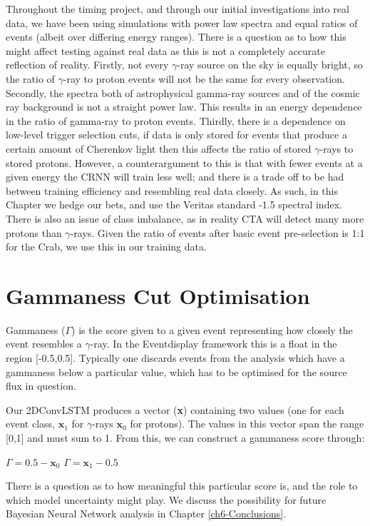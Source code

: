 Throughout the timing project, and through our initial investigations into real data, we have been using simulations with power law spectra and equal ratios of events (albeit over differing energy ranges). There is a question as to how this might affect testing against real data as this is not a completely accurate reflection of reality. Firstly, not every $\gamma$-ray source on the sky is equally bright, so the ratio of $\gamma$-ray to proton events will not be the same for every observation. Secondly, the spectra both of astrophysical gamma-ray sources and of the cosmic ray background is not a straight power law. This results in an energy dependence in the ratio of gamma-ray to proton events. Thirdly, there is a dependence on low-level trigger selection cuts, if data is only stored for events that produce a certain amount of Cherenkov light then this affects the ratio of stored $\gamma$-rays to stored protons. However, a counterargument to this is that with fewer events at a given energy the CRNN will train less well; and there is a trade off to be had between training efficiency and resembling real data closely. As such, in this Chapter we hedge our bets, and use the Veritas standard -1.5 spectral index. There is also an issue of class imbalance, as in reality CTA will detect many more protons than $\gamma$-rays. Given the ratio of events after basic event pre-selection is 1:1 for the Crab, we use this in our training data.

\section{Gammaness Cut Optimisation}
Gammaness ($\Gamma$) is the score given to a given event representing how closely the event resembles a $\gamma$-ray. In the Eventdisplay framework this is a float in the region [-0.5,0.5]. Typically one discards events from the analysis which have a gammaness below a particular value, which has to be optimised for the source flux in question. 

Our 2DConvLSTM produces a vector (\textbf{x}) containing two values (one for each event class,   $\textbf{x}_1$ for $\gamma$-rays $\textbf{x}_0$ for protons). The values in this vector span the range [0,1] and must sum to 1. From this, we can construct a gammaness score through:

\begin{algorithmic}
    \STATE $\Gamma=0.5-\textbf{x}_0$
    \ELSE
    \STATE $\Gamma=\textbf{x}_1-0.5$
    \ENDIF
\end{algorithmic}
There is a question as to how meaningful this particular score is, and the role to which model uncertainty might play. We discuss the possibility for future Bayesian Neural Network analysis in Chapter \ref{ch6-Conclusions}.

